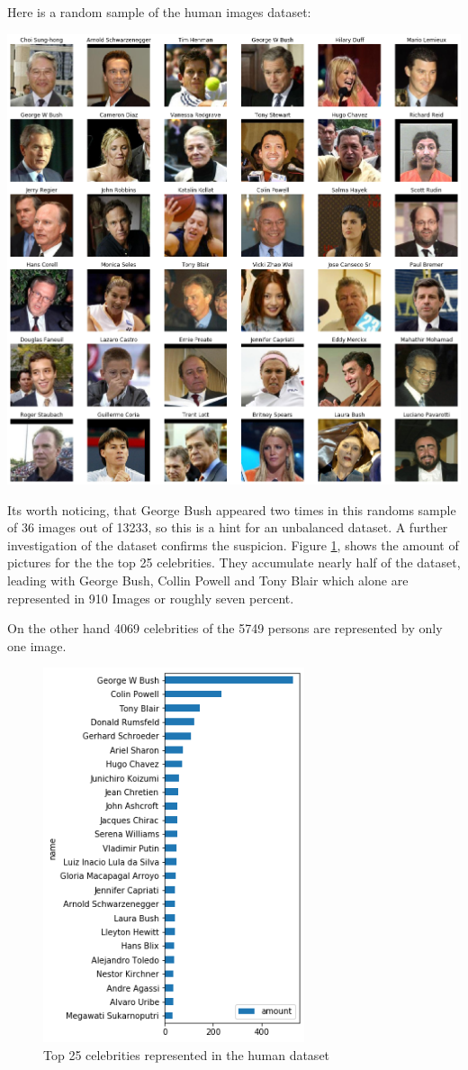 \documentclass[paper=A4, DIV=10, parskip=half]{scrartcl}
\begin{document}
Here is a random sample of the human images dataset:

\includegraphics[width=\textwidth]{images/human_sample.png}

Its worth noticing, that George Bush appeared two times in this randoms sample
of 36 images out of 13233, so this is a hint for an unbalanced dataset. A
further investigation of the dataset confirms the suspicion. Figure
\ref{human_balance}, shows the amount of pictures for the the
top 25 celebrities. They accumulate nearly half of the dataset, leading with
George Bush, Collin Powell and Tony Blair which alone are represented in 910
Images or roughly seven percent.

On the other hand 4069 celebrities of the 5749 persons are represented by only
one image.

\begin{figure}[h]
  \centering
  \includegraphics[height=11cm]{images/human_balance.png}
  \caption{Top 25 celebrities represented in the human dataset}
  \label{human_balance}
\end{figure}
\end{document}
